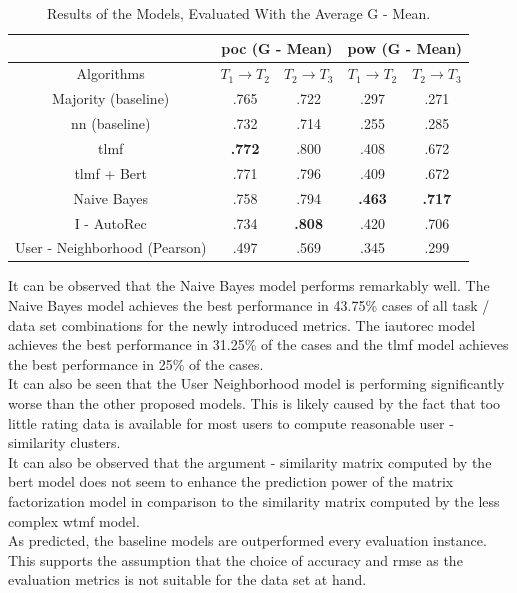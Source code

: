 \begin{table}[h!]
    \centering
    \begin{tabular}{|c|c|c|c|c|}
    \hline
     & \multicolumn{2}{|c|}{\acrshort{poc} (G - Mean)} & \multicolumn{2}{|c|}{\acrshort{pow} (G - Mean)} \\
     \hline
    Algorithms & $T_1 \to T_2$ & $T_2 \to T_3$ & $T_1 \to T_2$ & $T_2 \to T_3$\\
    \hline  Majority (baseline) & .765 & .722 & .297 & .271 \\ 
    \acrshort{nn} (baseline) & .732 & .714 & .255 & .285\\
    \acrshort{tlmf} & \textbf{.772} & .800 & .408 & .672 \\
    \acrshort{tlmf} + Bert & .771 & .796 & .409 & .672\\
    Naive Bayes & .758 & .794 & \textbf{.463} & \textbf{.717} \\
    I - AutoRec & .734 & \textbf{.808} & .420 & .706\\
    User - Neighborhood (Pearson) & .497 & .569 & .345 & .299\\
    \hline
    \end{tabular}
    \caption{Results of the Models, Evaluated With the Average G - Mean.}
    \label{tab:results_g_mean}
\end{table}
\noindent It can be observed that the Naive Bayes model performs remarkably well. The Naive Bayes model achieves the best performance in 43.75\% cases of all task / data set combinations for the newly introduced metrics. The \acrshort{iautorec} model achieves the best performance in 31.25\% of the cases and the \acrshort{tlmf} model achieves the best performance in 25\% of the cases.\\ It can also be seen that the User Neighborhood model is performing significantly worse than the other proposed models. This is likely caused by the fact that too little rating data is available for most users to compute reasonable user - similarity clusters.\\
It can also be observed that the argument - similarity matrix computed by the \acrshort{bert} model does not seem to enhance the prediction power of the matrix factorization model in comparison to the similarity matrix computed by the less complex \acrshort{wtmf} model.\\
As predicted, the baseline models are outperformed every evaluation instance. This supports the assumption that the choice of accuracy and \acrshort{rmse} as the evaluation metrics is not suitable for the data set at hand.\\
